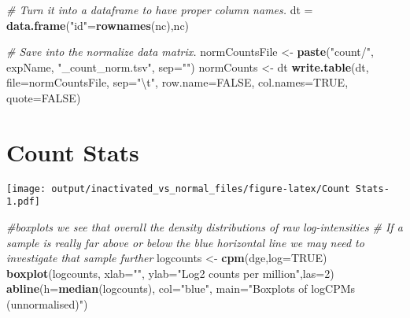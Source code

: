 \documentclass[]{article}
\newenvironment{Shaded}{\begin{snugshade}}{\end{snugshade}}
\newcommand{\KeywordTok}[1]{\textcolor[rgb]{0.13,0.29,0.53}{\textbf{#1}}}
\newcommand{\DataTypeTok}[1]{\textcolor[rgb]{0.13,0.29,0.53}{#1}}
\newcommand{\DecValTok}[1]{\textcolor[rgb]{0.00,0.00,0.81}{#1}}
\newcommand{\FloatTok}[1]{\textcolor[rgb]{0.00,0.00,0.81}{#1}}
\newcommand{\CharTok}[1]{\textcolor[rgb]{0.31,0.60,0.02}{#1}}
\newcommand{\StringTok}[1]{\textcolor[rgb]{0.31,0.60,0.02}{#1}}
\newcommand{\CommentTok}[1]{\textcolor[rgb]{0.56,0.35,0.01}{\textit{#1}}}
\newcommand{\OtherTok}[1]{\textcolor[rgb]{0.56,0.35,0.01}{#1}}
\newcommand{\OperatorTok}[1]{\textcolor[rgb]{0.81,0.36,0.00}{\textbf{#1}}}
\newcommand{\NormalTok}[1]{#1}
\begin{document}
\begin{Shaded}
\begin{Highlighting}[]
\CommentTok{# Turn it into a dataframe to have proper column names.}
\NormalTok{dt =}\StringTok{ }\KeywordTok{data.frame}\NormalTok{(}\StringTok{"id"}\NormalTok{=}\KeywordTok{rownames}\NormalTok{(nc),nc)}

\CommentTok{# Save into the normalize data matrix.}
\NormalTok{normCountsFile <-}\StringTok{ }\KeywordTok{paste}\NormalTok{(}\StringTok{"count/"}\NormalTok{, expName, }\StringTok{"_count_norm.tsv"}\NormalTok{, }\DataTypeTok{sep=}\StringTok{""}\NormalTok{)}
\NormalTok{normCounts <-}\StringTok{ }\NormalTok{dt}
\KeywordTok{write.table}\NormalTok{(dt, }\DataTypeTok{file=}\NormalTok{normCountsFile, }\DataTypeTok{sep=}\StringTok{"}\CharTok{\textbackslash{}t}\StringTok{"}\NormalTok{, }\DataTypeTok{row.name=}\OtherTok{FALSE}\NormalTok{, }\DataTypeTok{col.names=}\OtherTok{TRUE}\NormalTok{, }\DataTypeTok{quote=}\OtherTok{FALSE}\NormalTok{)}
\end{Highlighting}
\end{Shaded}

\section{Count Stats}\label{count-stats}

\begin{Shaded}
\end{Shaded}

\texttt{[image: output/inactivated\_vs\_normal\_files/figure-latex/Count Stats-1.pdf]}

\begin{Shaded}
\begin{Highlighting}[]
\CommentTok{#boxplots we see that overall the density distributions of raw log-intensities}
\CommentTok{# If a sample is really far above or below the blue horizontal line we may need to investigate that sample further}
\NormalTok{logcounts <-}\StringTok{ }\KeywordTok{cpm}\NormalTok{(dge,}\DataTypeTok{log=}\OtherTok{TRUE}\NormalTok{)}
\KeywordTok{boxplot}\NormalTok{(logcounts, }\DataTypeTok{xlab=}\StringTok{""}\NormalTok{, }\DataTypeTok{ylab=}\StringTok{"Log2 counts per million"}\NormalTok{,}\DataTypeTok{las=}\DecValTok{2}\NormalTok{)}
\KeywordTok{abline}\NormalTok{(}\DataTypeTok{h=}\KeywordTok{median}\NormalTok{(logcounts), }\DataTypeTok{col=}\StringTok{"blue"}\NormalTok{, }\DataTypeTok{main=}\StringTok{"Boxplots of logCPMs (unnormalised)"}\NormalTok{)}
\end{Highlighting}
\end{Shaded}
\end{document}
